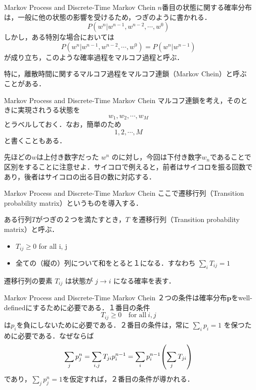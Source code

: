 \documentclass[aspectratio=169, dvipdfmx, 11pt,uplatex]{beamer} %
\begin{document}
\begin{frame}{Markov Process and Discrete-Time Markov Chein}
  $n$番目の状態に関する確率分布は，一般に他の状態の影響を受けるため，つぎのように書かれる．
  \begin{equation}
    P(w^n | w^{n-1}, w^{n-2}, \cdots, w^0)
  \end{equation}
  しかし，ある特別な場合においては
  \begin{equation}
    P(w^n | w^{n-1}, w^{n-2}, \cdots, w^0) = P(w^n|w^{n-1})
  \end{equation}
  が成り立ち，このような確率過程をマルコフ過程と呼ぶ．\par 
  特に，離散時間に関するマルコフ過程をマルコフ連鎖（Markov Chein）と呼ぶことがある．
\end{frame}

\begin{frame}{Markov Process and Discrete-Time Markov Chein}
  マルコフ連鎖を考え，そのときに実現されうる状態を
  \begin{equation}
    w_1, w_2, \cdots, w_M 
  \end{equation}
  とラベルしておく．なお，簡単のため
  \begin{equation}
    1, 2, \cdots, M 
  \end{equation}
  と書くこともある．\par 
  先ほどの$w$は上付き数字だった $w^n$ のに対し，今回は下付き数字$w_n$であることで区別をすることに注意せよ．サイコロで例えると，前者はサイコロを振る回数であり，後者はサイコロの出る目の数に対応する．
\end{frame}

\begin{frame}{Markov Process and Discrete-Time Markov Chein}
  ここで遷移行列（Transition probability matrix）というものを導入する．\par 
  ある行列$T$がつぎの２つを満たすとき，$T$ を遷移行列（Transition probability matrix）と呼ぶ．
  \begin{itemize}
    \item $T_{ij} \geqslant 0$ for all i, j
    \item 全ての（縦の）列について和をとると１になる．すなわち $\sum_i T_{ij} = 1$
  \end{itemize}
  遷移行列の要素 $T_{ij}$ は状態が $j \to i$ になる確率を表す．
\end{frame}

\begin{frame}{Markov Process and Discrete-Time Markov Chein}
  ２つの条件は確率分布$\mathbf{p}$をwell-definedにするために必要である．１番目の条件
  \begin{equation}
    T_{ij} \geqslant 0 \quad  \text{for all} \  i, j
  \end{equation}
  は$p_i$を負にしないために必要である．２番目の条件は，常に $\sum_i p_i = 1$ を保つために必要である．なぜならば
  \begin{equation}
    \sum_j p^n_j = \sum_{i, j} T_{ji} p_i^{n-1} = \sum_i p_i^{n-1} \qty( \sum_j T_{ji} )
  \end{equation}
  であり，$\sum_j p^n_j = 1$を仮定すれば，２番目の条件が導かれる．
\end{frame}
\end{document}
